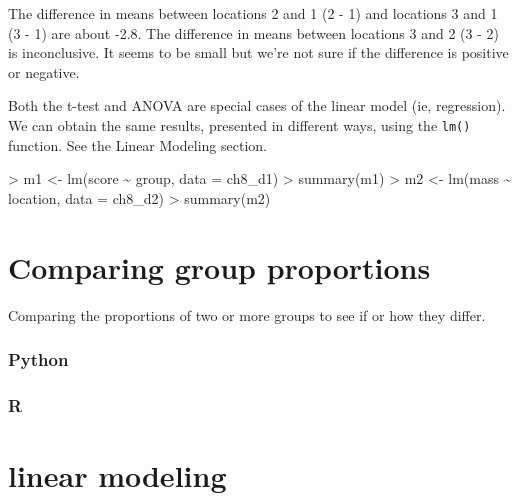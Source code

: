 \documentclass[
]{book}
\newenvironment{Shaded}{\begin{snugshade}}{\end{snugshade}}
\newcommand{\AttributeTok}[1]{\textcolor[rgb]{0.77,0.63,0.00}{#1}}
\newcommand{\FunctionTok}[1]{\textcolor[rgb]{0.00,0.00,0.00}{#1}}
\newcommand{\NormalTok}[1]{#1}
\newcommand{\OtherTok}[1]{\textcolor[rgb]{0.56,0.35,0.01}{#1}}
\newcommand{\SpecialCharTok}[1]{\textcolor[rgb]{0.00,0.00,0.00}{#1}}
\begin{document}
The difference in means between locations 2 and 1 (2 - 1) and locations 3 and 1 (3 - 1) are about -2.8. The difference in means between locations 3 and 2 (3 - 2) is inconclusive. It seems to be small but we're not sure if the difference is positive or negative.

Both the t-test and ANOVA are special cases of the linear model (ie, regression). We can obtain the same results, presented in different ways, using the \texttt{lm()} function. See the Linear Modeling section.

\begin{Shaded}
\begin{Highlighting}[]
\SpecialCharTok{\textgreater{}}\NormalTok{ m1 }\OtherTok{\textless{}{-}} \FunctionTok{lm}\NormalTok{(score }\SpecialCharTok{\textasciitilde{}}\NormalTok{ group, }\AttributeTok{data =}\NormalTok{ ch8\_d1)}
\SpecialCharTok{\textgreater{}} \FunctionTok{summary}\NormalTok{(m1)}
\SpecialCharTok{\textgreater{}}\NormalTok{ m2 }\OtherTok{\textless{}{-}} \FunctionTok{lm}\NormalTok{(mass }\SpecialCharTok{\textasciitilde{}}\NormalTok{ location, }\AttributeTok{data =}\NormalTok{ ch8\_d2)}
\SpecialCharTok{\textgreater{}} \FunctionTok{summary}\NormalTok{(m2)}
\end{Highlighting}
\end{Shaded}

\hypertarget{comparing-group-proportions}{%
\section{Comparing group proportions}\label{comparing-group-proportions}}

Comparing the proportions of two or more groups to see if or how they differ.

\hypertarget{python-45}{%
\subsubsection*{Python}\label{python-45}}

\hypertarget{r-45}{%
\subsubsection*{R}\label{r-45}}

\hypertarget{linear-modeling}{%
\section{linear modeling}\label{linear-modeling}}
\end{document}

